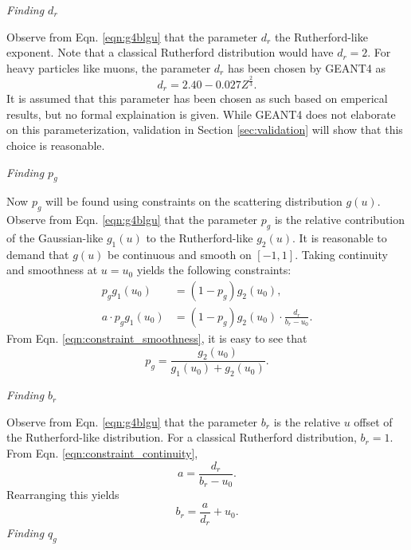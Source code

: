 \noindent \textit{\large{Finding $d_r$}}


Observe from Eqn. \ref{eqn:g4blgu} that the parameter $d_r$ the Rutherford-like exponent. Note that a classical Rutherford distribution would have $d_r=2$. For heavy particles like muons, the parameter $d_r$ has been chosen by GEANT4 \cite{geant4} as
\begin{equation}
d_r=2.40-0.027Z^{\frac{2}{3}}.
\label{eqn:geantd}
\end{equation}
It is assumed that this parameter has been chosen as such based on emperical results, but no formal explaination is given. While GEANT4 \cite{geant4} does not elaborate on this parameterization, validation in Section \ref{sec:validation} will show that this choice is reasonable.

\noindent \textit{\large{Finding $p_g$}}

Now $p_g$ will be found using constraints on the scattering distribution $g(u)$. Observe from Eqn. \ref{eqn:g4blgu} that the parameter $p_g$ is the relative contribution of the Gaussian-like $g_1(u)$ to the Rutherford-like $g_2(u)$. It is reasonable to demand that $g(u)$ be continuous and smooth on $[-1,1]$. Taking continuity and smoothness at $u=u_0$ yields the following constraints:
%
\begin{align}
p_g g_1(u_0)&=(1-p_g)g_2(u_0), \label{eqn:constraint_smoothness}\\
a\cdot p_g g_1(u_0)&=(1-p_g)g_2(u_0)\cdot\frac{d_r}{b_r-u_0}. \label{eqn:constraint_continuity}
\end{align}
%
From Eqn. \ref{eqn:constraint_smoothness}, it is easy to see that
%
\begin{equation}
p_g=\frac{g_2(u_0)}{g_1(u_0)+g_2(u_0)}.
\label{eqn:geantp}
\end{equation}
%

\noindent \textit{\large{Finding $b_r$}}

Observe from Eqn. \ref{eqn:g4blgu} that the parameter $b_r$ is the relative $u$ offset of the Rutherford-like distribution. For a classical Rutherford distribution, $b_r=1$. From Eqn. \ref{eqn:constraint_continuity},
%
\begin{equation}\nonumber
a=\frac{d_r}{b_r-u_0}.
\end{equation}
%
Rearranging this yields
%
\begin{equation}
b_r=\frac{a}{d_r}+u_0.
\label{eqn:geantb}
\end{equation}
%
\noindent \textit{\large{Finding $q_g$}}

